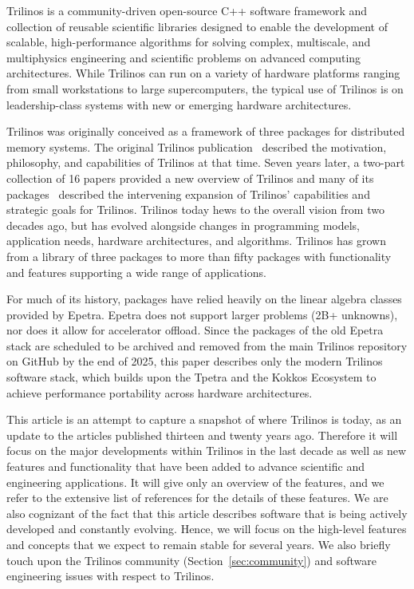 
Trilinos is a community-driven open-source C++ software framework and collection of reusable scientific libraries designed to enable the development of scalable, high-performance algorithms for solving complex, multiscale, and multiphysics engineering and scientific problems on advanced computing architectures.
While Trilinos can run on a variety of hardware platforms ranging from small workstations to large supercomputers, the typical use of Trilinos is on leadership-class systems with new or emerging hardware architectures.

Trilinos was originally conceived as a framework of three packages for distributed memory systems. The original Trilinos publication~\cite{Heroux2005a} described the motivation, philosophy, and capabilities of Trilinos at that time. Seven years later, a two-part collection of 16 papers provided a new overview of Trilinos and many of its packages~\cite{Heroux2012,HerouxIntro2012part1,HerouxIntro2012part2,pawlowski2012automating,Oldfield2012,bochev2012,Boman2012,Baker2012,Kokkos2012,pawlowski2012automatingpart2,Spotz2012,Long2012,Morris2012,Howle2012,Bavier2012a,Gaidamour2012} described the intervening expansion of Trilinos' capabilities and strategic goals for Trilinos. Trilinos today hews to the overall vision from two decades ago, but has evolved alongside changes in programming models, application needs, hardware architectures, and algorithms. Trilinos has grown from a library of three packages to more than fifty packages with functionality and features supporting a wide range of applications.

For much of its history, packages have relied heavily on the linear algebra classes provided by Epetra.
Epetra does not support larger problems (2B+ unknowns), nor does it allow for accelerator offload.
Since the packages of the old Epetra stack are scheduled to be archived and removed from the main Trilinos repository on GitHub by the end of 2025, this paper describes only the modern Trilinos software stack, which builds upon the Tpetra and the Kokkos Ecosystem to achieve performance portability across hardware architectures.

This article is an attempt to capture a snapshot of where Trilinos is today, as an update to the articles published thirteen and twenty years ago.
Therefore it will focus on the major developments within Trilinos in the last decade as well as new features and functionality that have been added to advance scientific and engineering applications.
It will give only an overview of the features, and we refer to the extensive list of references for the details of these features.
We are also cognizant of the fact that this article describes software that is being actively developed and constantly evolving.
Hence, we will focus on the high-level features and concepts that we expect to remain stable for several years.
We also briefly touch upon the Trilinos community (Section~\ref{sec:community}) and software engineering issues with respect to Trilinos.

